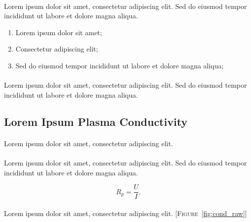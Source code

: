 \paragraph{} 
Lorem ipsum dolor sit amet, consectetur adipiscing elit. Sed do eiusmod tempor incididunt ut labore et dolore magna aliqua.

\;

\begin{enumerate}
    \item Lorem ipsum dolor sit amet;
    \item Consectetur adipiscing elit;
    \item Sed do eiusmod tempor incididunt ut labore et dolore magna aliqua;
\end{enumerate}

\paragraph{} 
Lorem ipsum dolor sit amet, consectetur adipiscing elit. Sed do eiusmod tempor incididunt ut labore et dolore magna aliqua.

\subsection*{Lorem Ipsum Plasma Conductivity}

\paragraph{}
Lorem ipsum dolor sit amet, consectetur adipiscing elit.

\paragraph{}
Lorem ipsum dolor sit amet, consectetur adipiscing elit. Sed do eiusmod tempor incididunt ut labore et dolore magna aliqua.

$$
R_p = \frac{U}{I}.
$$

\paragraph{}
Lorem ipsum dolor sit amet, consectetur adipiscing elit.  
[\textsc{Figure}~\ref{fig:cond_raw}]

